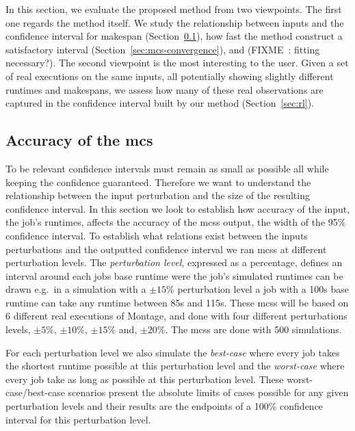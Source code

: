 \documentclass[10pt,conference,compsocconf]{IEEEtran}
\newcommand{\pmpc}[1]{$\pm#1\%$}
\begin{document}
In this section, we evaluate the  proposed method from two viewpoints. The first
one regards the method itself. We  study the relationship between inputs and the
confidence interval for makespan  (Section~\ref{sec:mcs-accuracy}), how fast the
method  construct a  satisfactory interval  (Section~\ref{sec:mcs-convergence}),
and  (FIXME~:  fitting  necessary?).   The  second  viewpoint  is  the  most
interesting to the user.  Given a set of real executions on the same inputs, all
potentially showing  slightly different  runtimes and  makespans, we  assess how
many of these real observations are captured in the confidence interval built by
our method (Section~\ref{sec:rl}).
  


\subsection{Accuracy of the \acl{mcs}}
\label{sec:mcs-accuracy}

To be relevant  confidence intervals must remain as small  as possible all while
keeping  the  confidence  guaranteed.  Therefore   we  want  to  understand  the
relationship  between the  input  perturbation  and the  size  of the  resulting
confidence interval.  In this section we  look to establish how accuracy of the
input, the  job's runtimes, affects the accuracy of the \acp{mcs}  output, the
width  of the  95\%  confidence  interval.  To  establish  what relations  exist
between the  inputs perturbations and  the outputted confidence interval  we ran
\acp{mcs}  at different  perturbation  levels.   The \emph{perturbation  level},
expressed as  a percentage, defines  an interval  around each jobs  base runtime
were the job's  simulated runtimes can be  drawn \textendash{} e.g.~in a  simulation with a
\pmpc{15} perturbation level a job with a 100s base runtime can take any runtime
between  85s  and 115s.  These  \acp{mcs}  will be  based  on  6 different  real
executions  of  Montage, and  done  with  four different  perturbations  levels,
\pmpc{5}, \pmpc{10}, \pmpc{15} and, \pmpc{20}.   The \acp{mcs} are done with 500
simulations.

For each perturbation level we also simulate the \emph{best-case} where every
job takes the shortest runtime possible at this perturbation level and the
\emph{worst-case} where every job take as long as possible at this perturbation
level. These worst-case/best-case scenarios present the absolute limits of cases
possible for any given perturbation levels and their results are the endpoints
of a 100\% confidence interval for this perturbation level.
\end{document}
